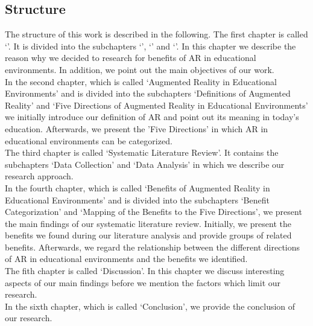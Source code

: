 \subsection{Structure}
\label{subsec:Structure}
The structure of this work is described in the following. The first chapter is called ‘’. It is divided into the subchapters ‘’, ‘’ and ‘’. In this chapter we describe the reason why we decided to research for benefits of AR in educational environments. In addition, we point out the main objectives of our work.\\
In the second chapter, which is called ‘Augmented Reality in Educational Environments’ and is divided into the subchapters ‘Definitions of Augmented Reality’ and ‘Five Directions of Augmented Reality in Educational Environments’ we initially introduce our definition of AR and point out its meaning in today's education. Afterwards, we present the 'Five Directions' \autocite [cf.][126-130]{Yuen.2011} in which AR in educational environments can be categorized.\\
The third chapter is called ‘Systematic Literature Review’. It contains the subchapters ‘Data Collection’ and ‘Data Analysis’ in which we describe our research approach.\\
In the fourth chapter, which is called ‘Benefits of Augmented Reality in Educational Environments’ and is divided into the subchapters ‘Benefit Categorization’ and ‘Mapping of the Benefits to the Five Directions’, we present the main findings of our systematic literature review. Initially, we present the benefits we found during our literature analysis and provide groups of related benefits. Afterwards, we regard the relationship between the different directions of AR in educational environments and the benefits we identified.\\
The fith chapter is called ‘Discussion’. In this chapter we discuss interesting aspects of our main findings before we mention the factors which limit our research.\\
In the sixth chapter, which is called ‘Conclusion’, we provide the conclusion of our research. %